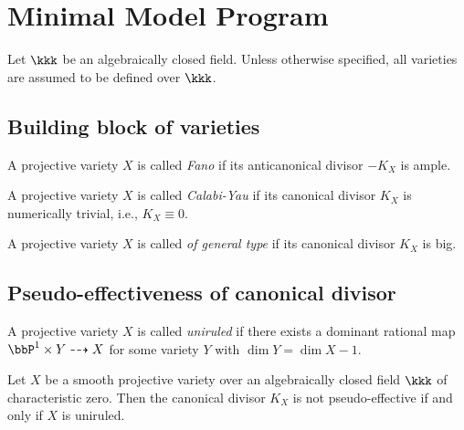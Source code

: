 \section{Minimal Model Program}

Let \(\kkk\) be an algebraically closed field.
Unless otherwise specified, all varieties are assumed to be defined over \(\kkk\).

\subsection{Building block of varieties}

    \begin{definition}\label{def:Fano_variety}
        A projective variety \(X\) is called \emph{Fano} if its anticanonical divisor \(-K_X\) is ample.
    \end{definition}

    \begin{definition}\label{def:Calabi_Yau_variety}
        A projective variety \(X\) is called \emph{Calabi-Yau} if its canonical divisor \(K_X\) is numerically trivial, i.e., \(K_X\equiv 0\).
    \end{definition}

    \begin{definition}\label{def:variety_of_general_type}
        A projective variety \(X\) is called \emph{of general type} if its canonical divisor \(K_X\) is big.
    \end{definition}

\subsection{Pseudo-effectiveness of canonical divisor}

    \begin{definition}\label{def:uniruled_variety}
        A projective variety \(X\) is called \emph{uniruled} if there exists a dominant rational map \(\bbP^1\times Y\dashrightarrow X\) for some variety \(Y\) with \(\dim Y=\dim X-1\).
    \end{definition}

    \begin{theorem}\label{thm:K_X_not_pseudo_effective_iff_uniruled}
        Let \(X\) be a smooth projective variety over an algebraically closed field \(\kkk\) of characteristic zero.
        Then the canonical divisor \(K_X\) is not pseudo-effective if and only if \(X\) is uniruled.
    \end{theorem}
